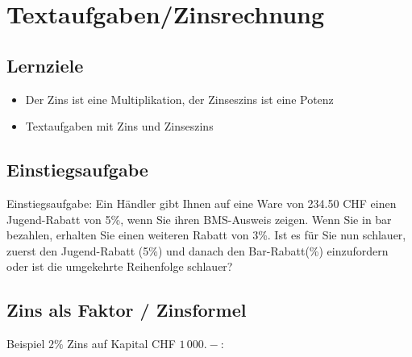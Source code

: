 
\newpage
\section{Textaufgaben/Zinsrechnung}
\subsection*{Lernziele}

\begin{itemize}
  \item Der Zins ist eine  Multiplikation, der Zinseszins ist eine Potenz
\item Textaufgaben mit Zins und Zinseszins
\end{itemize}

\subsection{Einstiegsaufgabe}
Einstiegsaufgabe:
Ein Händler gibt Ihnen auf eine Ware von 234.50 CHF einen Jugend-Rabatt von
5\%, wenn Sie ihren BMS-Ausweis zeigen. Wenn Sie in bar bezahlen, erhalten Sie
einen weiteren Rabatt von 3\%. Ist es für Sie nun schlauer, zuerst den
Jugend-Rabatt (5\%) und danach den Bar-Rabatt(\%) einzufordern oder
ist die umgekehrte Reihenfolge schlauer? 
\newpage



\subsection{Zins als Faktor / Zinsformel}
Beispiel $2\%$ Zins auf Kapital CHF $1\,000.-$:\\

